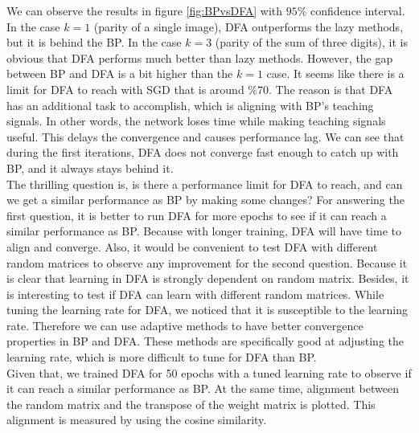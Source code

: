 \documentclass[a4paper, nobind]{templates/ociamthesis}
\begin{document}
\noindent We can observe the results in figure \ref{fig:BPvsDFA} with \(95\%\) confidence interval. In the case \(k=1\) (parity of a single image), DFA outperforms the lazy methods, but it is behind the BP. In the case \(k=3\) (parity of the sum of three digits), it is obvious that DFA performs much better than lazy methods. However, the gap between BP and DFA is a bit higher than the \(k=1\) case. It seems like there is a limit for DFA to reach with SGD that is around \(\%70\). The reason is that DFA has an additional task to accomplish, which is aligning with BP's teaching signals. In other words, the network loses time while making teaching signals useful. This delays the convergence and causes performance lag. We can see that during the first iterations, DFA does not converge fast enough to catch up with BP, and it always stays behind it.\\
The thrilling question is, is there a performance limit for DFA to reach, and can we get a similar performance as BP by making some changes? For answering the first question, it is better to run DFA for more epochs to see if it can reach a similar performance as BP. Because with longer training, DFA will have time to align and converge. Also, it would be convenient to test DFA with different random matrices to observe any improvement for the second question. Because it is clear that learning in DFA is strongly dependent on random matrix. Besides, it is interesting to test if DFA can learn with different random matrices. While tuning the learning rate for DFA, we noticed that it is susceptible to the learning rate. Therefore we can use adaptive methods to have better convergence properties in BP and DFA. These methods are specifically good at adjusting the learning rate, which is more difficult to tune for DFA than BP.\\
\noindent Given that, we trained DFA for 50 epochs with a tuned learning rate to observe if it can reach a similar performance as BP. At the same time, alignment between the random matrix and the transpose of the weight matrix is plotted. This alignment is measured by using the cosine similarity.
\end{document}
